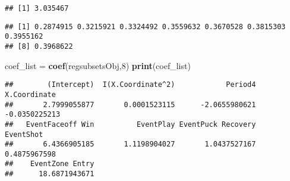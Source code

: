 \documentclass[
  a3paper,
]{article}
\newenvironment{Shaded}{\begin{snugshade}}{\end{snugshade}}
\newcommand{\AttributeTok}[1]{\textcolor[rgb]{0.13,0.29,0.53}{#1}}
\newcommand{\CommentTok}[1]{\textcolor[rgb]{0.56,0.35,0.01}{\textit{#1}}}
\newcommand{\ConstantTok}[1]{\textcolor[rgb]{0.56,0.35,0.01}{#1}}
\newcommand{\DecValTok}[1]{\textcolor[rgb]{0.00,0.00,0.81}{#1}}
\newcommand{\FunctionTok}[1]{\textcolor[rgb]{0.13,0.29,0.53}{\textbf{#1}}}
\newcommand{\NormalTok}[1]{#1}
\newcommand{\OtherTok}[1]{\textcolor[rgb]{0.56,0.35,0.01}{#1}}
\newcommand{\SpecialCharTok}[1]{\textcolor[rgb]{0.81,0.36,0.00}{\textbf{#1}}}
\begin{document}
\begin{verbatim}
## [1] 3.035467
\end{verbatim}

\begin{Shaded}
\end{Shaded}

\begin{verbatim}
## [1] 0.2874915 0.3215921 0.3324492 0.3559632 0.3670528 0.3815303 0.3955162
## [8] 0.3968622
\end{verbatim}

\begin{Shaded}
\begin{Highlighting}[]
\NormalTok{coef\_list }\OtherTok{=} \FunctionTok{coef}\NormalTok{(regsubsetsObj,}\DecValTok{8}\NormalTok{)}
\FunctionTok{print}\NormalTok{(coef\_list)}
\end{Highlighting}
\end{Shaded}

\begin{verbatim}
##        (Intercept)  I(X.Coordinate^2)            Period4       X.Coordinate 
##       2.7999055877       0.0001523115      -2.0655980621      -0.0350225213 
##   EventFaceoff Win          EventPlay EventPuck Recovery          EventShot 
##       6.4366905185       1.1198904027       1.0437527167       0.4875967598 
##    EventZone Entry 
##      18.6871943671
\end{verbatim}
\end{document}
